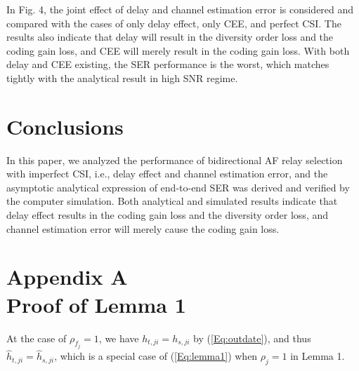 \documentclass[onecolumn,letterpaper,11pt,draftclsnofoot]{IEEEtran}
\begin{document}
In Fig. 4, the joint effect of delay and channel estimation error is
considered and compared with the cases of only delay effect, only
CEE, and perfect CSI. The results also indicate that delay will result
in the diversity order loss and the coding gain loss, and CEE will
merely result in the coding gain loss. With both delay and CEE
existing, the SER performance is the worst, which matches tightly
with the analytical result in high SNR regime.

\section{Conclusions}

In this paper, we analyzed the performance of bidirectional AF relay
selection with imperfect CSI, i.e., delay effect and channel
estimation error, and the asymptotic analytical expression of
end-to-end SER was derived and verified by the computer simulation.
Both analytical and simulated results indicate that delay effect results in
the coding gain loss and the diversity order loss, and channel
estimation error will merely cause the coding gain loss.

\section*{Appendix A\\Proof of Lemma 1}
At the case of $\rho_{f_j}=1$, we have $h_{t,ji} = h_{s,ji}$ by
(\ref{Eq:outdate}), and thus $\hat h_{t,ji}=\hat h_{s,ji}$, which is a
special case of (\ref{Eq:lemma1}) when $\rho_j=1$ in Lemma 1.
\end{document}
